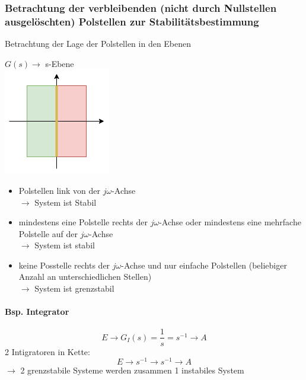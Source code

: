\documentclass{article}
\begin{document}
\subsubsection*{Betrachtung der verbleibenden (nicht durch Nullstellen ausgelöschten) Polstellen zur Stabilitätsbestimmung}
Betrachtung der Lage der Polstellen in den Ebenen
\begin{paracol}{2}
$G(s) \rightarrow$  s-Ebene \\
\includegraphics[scale=0.8]{img/2024_11_20_s-Ebene.png}
\begin{itemize}
	\item Polstellen link von der $j\omega$-Achse \\
	$\rightarrow$ System ist Stabil
	\item mindestens eine Polstelle rechts der $j\omega$-Achse oder mindestens eine mehrfache Polstelle auf der $j\omega$-Achse \\
	$\rightarrow$ System ist stabil
	\item keine Posstelle rechts der $j\omega$-Achse und nur einfache Polstellen (beliebiger Anzahl an unterschiedlichen Stellen) \\
	$\rightarrow$ System ist grenzstabil
\end{itemize}
\paragraph{Bsp. Integrator}
\[
E \rightarrow G_I(s)=\frac{1}{s} = s^{-1} \rightarrow A
\]
2 Intigratoren in Kette:
\[
E \rightarrow s^{-1} \rightarrow s^{-1} \rightarrow A
\]
$\rightarrow$ 2 grenzstabile Systeme werden zusammen 1 instabiles System

\switchcolumn


\end{paracol}
\end{document}
